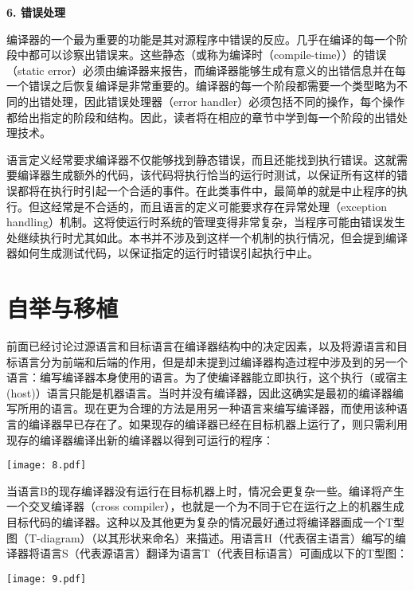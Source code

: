 \documentclass[lang=cn,10pt]{elegantbook}
\begin{document}
\textbf{6. 错误处理}

编译器的一个最为重要的功能是其对源程序中错误的反应。几乎在编译的每一个阶段中都可以诊察出错误来。这些静态（或称为编译时（compile-time））的错误（static error）必须由编译器来报告，而编译器能够生成有意义的出错信息并在每一个错误之后恢复编译是非常重要的。编译器的每一个阶段都需要一个类型略为不同的出错处理，因此错误处理器（error handler）必须包括不同的操作，每个操作都给出指定的阶段和结构。因此，读者将在相应的章节中学到每一个阶段的出错处理技术。

语言定义经常要求编译器不仅能够找到静态错误，而且还能找到执行错误。这就需要编译器生成额外的代码，该代码将执行恰当的运行时测试，以保证所有这样的错误都将在执行时引起一个合适的事件。在此类事件中，最简单的就是中止程序的执行。但这经常是不合适的，而且语言的定义可能要求存在异常处理（exception handling）机制。这将使运行时系统的管理变得非常复杂，当程序可能由错误发生处继续执行时尤其如此。本书并不涉及到这样一个机制的执行情况，但会提到编译器如何生成测试代码，以保证指定的运行时错误引起执行中止。

\section{自举与移植}
\label{sec:1-6}

前面已经讨论过源语言和目标语言在编译器结构中的决定因素，以及将源语言和目标语言分为前端和后端的作用，但是却未提到过编译器构造过程中涉及到的另一个语言：编写编译器本身使用的语言。为了使编译器能立即执行，这个执行（或宿主 (host)）语言只能是机器语言。当时并没有编译器，因此这确实是最初的编译器编写所用的语言。现在更为合理的方法是用另一种语言来编写编译器，而使用该种语言的编译器早已存在了。如果现存的编译器已经在目标机器上运行了，则只需利用现存的编译器编译出新的编译器以得到可运行的程序：

\begin{center}
  \texttt{[image: 8.pdf]}
\end{center}

当语言B的现存编译器没有运行在目标机器上时，情况会更复杂一些。编译将产生一个交叉编译器（cross compiler），也就是一个为不同于它在运行之上的机器生成目标代码的编译器。这种以及其他更为复杂的情况最好通过将编译器画成一个T型图（T-diagram）（以其形状来命名）来描述。用语言H（代表宿主语言）编写的编译器将语言S（代表源语言）翻译为语言T（代表目标语言）可画成以下的T型图：

\begin{center}
  \texttt{[image: 9.pdf]}
\end{center}
\end{document}
